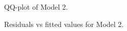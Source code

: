\documentclass[review,12pt,authoryear]{elsarticle}
\begin{document}
\begin{linenumbers}
\begin{figure}
  \caption{QQ-plot of Model 2.}
\end{figure}

\begin{figure}
  \caption{Residuals vs fitted values for Model 2.}
\end{figure}


\end{linenumbers}
\end{document}
